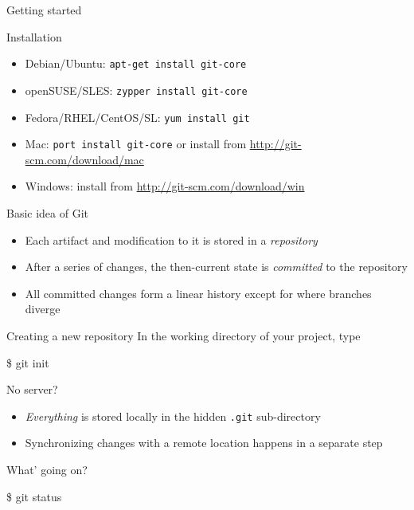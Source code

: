 \documentclass[18pt]{beamer}
\newenvironment{shell}[1][\linewidth]
  {\begin{mdframed}[
  skipabove=\topsep,
  skipbelow=\topsep,
  font=\ttfamily,
  linecolor=KITblack15,
  backgroundcolor=KITblack15,
  leftmargin=6pt,
  rightmargin=6pt,
  innertopmargin=6pt,
  innerbottommargin=6pt,
  innerleftmargin=12pt,
  innerrightmargin=12pt,
  userdefinedwidth=#1]}
  {\end{mdframed}}
\begin{document}
\begin{frame}{Getting started}
  \begin{block}{Installation}
    \begin{itemize}
      \item Debian/Ubuntu: \texttt{apt-get install git-core}
      \item openSUSE/SLES: \texttt{zypper install git-core}
      \item Fedora/RHEL/CentOS/SL: \texttt{yum install git}
      \item Mac: \texttt{port install git-core} or install from
      \url{http://git-scm.com/download/mac}
      \item Windows: install from \url{http://git-scm.com/download/win}
    \end{itemize}
  \end{block}
\end{frame}
\begin{frame}{Basic idea of Git}
  \begin{itemize}
    \item Each artifact and modification to it is stored in a
    \emph{repository}
    \item After a series of changes, the then-current state is \emph{committed}
      to the repository
    \item All committed changes form a linear history except for where branches
      diverge
  \end{itemize}
\end{frame}
\begin{frame}{Creating a new repository}
  In the working directory of your project, type
  \begin{shell}
    \$ git init
  \end{shell}
  \begin{block}{No server?}
    \begin{itemize}
      \item \emph{Everything} is stored locally in the hidden \texttt{.git}
        sub-directory
      \item Synchronizing changes with a remote location happens in a separate
        step
    \end{itemize}
  \end{block}
\end{frame}
\begin{frame}{What' going on?}
  \begin{shell}
    \$ git status
  \end{shell}
\end{frame}
\end{document}
